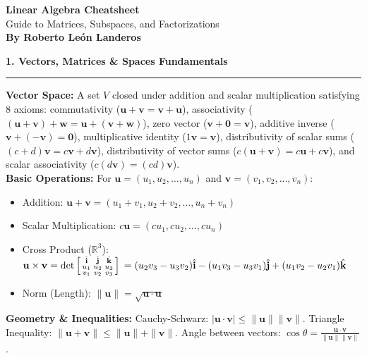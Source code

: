 \documentclass[10pt, landscape, twocolumn]{article}
\newcommand{\cheatsheetsection}[1]{
    \vspace{0.6em}
    {\color{themeblue}\large\bfseries #1} \par
    \vspace{-0.5em}
    {\color{themeblue}\rule{\linewidth}{1pt}} \par
    \vspace{0.2em}
}
\begin{document}
\begin{center}
    \vspace{-1em}
    {\color{themeblue}\huge\bfseries Linear Algebra Cheatsheet}\\[0.1em]
    {\color{themegray}\small Guide to Matrices, Subspaces, and Factorizations}\\[0.4em]
    {\color{themegray}\footnotesize \textbf{By Roberto León Landeros}}
\end{center}
\vspace{-1em}

\cheatsheetsection{1. Vectors, Matrices \& Spaces Fundamentals}
\textbf{Vector Space:} A set $V$ closed under addition and scalar multiplication satisfying 8 axioms: commutativity ($\mathbf{u}+\mathbf{v}=\mathbf{v}+\mathbf{u}$), associativity ($(\mathbf{u}+\mathbf{v})+\mathbf{w}=\mathbf{u}+(\mathbf{v}+\mathbf{w})$), zero vector ($\mathbf{v}+\mathbf{0}=\mathbf{v}$), additive inverse ($\mathbf{v}+(-\mathbf{v})=\mathbf{0}$), multiplicative identity ($1\mathbf{v}=\mathbf{v}$), distributivity of scalar sums ($(c+d)\mathbf{v}=c\mathbf{v}+d\mathbf{v}$), distributivity of vector sums ($c(\mathbf{u}+\mathbf{v})=c\mathbf{u}+c\mathbf{v}$), and scalar associativity ($c(d\mathbf{v})=(cd)\mathbf{v}$).\\
\textbf{Basic Operations:} For $\mathbf{u} = (u_1, u_2, \dots, u_n)$ and $\mathbf{v} = (v_1, v_2, \dots, v_n)$:
\begin{itemize}[leftmargin=*, itemsep=4pt, parsep=0pt]
    \item Addition: $\mathbf{u} + \mathbf{v} = (u_1+v_1, u_2+v_2, \dots, u_n+v_n)$
    \item Scalar Multiplication: $c\mathbf{u} = (cu_1, cu_2, \dots, cu_n)$
    \item Cross Product ($\mathbb{R}^3$): $\mathbf{u} \times \mathbf{v} = \det \left[ \begin{smallmatrix} \hat{\mathbf{i}} & \hat{\mathbf{j}} & \hat{\mathbf{k}} \\ u_1 & u_2 & u_3 \\ v_1 & v_2 & v_3 \end{smallmatrix} \right] \\= (u_2v_3 - u_3v_2)\hat{\mathbf{i}} - (u_1v_3 - u_3v_1)\hat{\mathbf{j}} + (u_1v_2 - u_2v_1)\hat{\mathbf{k}}$
    \item Norm (Length): $\|\mathbf{u}\| = \sqrt{\mathbf{u} \cdot \mathbf{u}}$
\end{itemize}
\textbf{Geometry \& Inequalities:} Cauchy-Schwarz: $|\mathbf{u} \cdot \mathbf{v}| \leq \|\mathbf{u}\|\|\mathbf{v}\|$. Triangle Inequality: $\|\mathbf{u} + \mathbf{v}\| \leq \|\mathbf{u}\| + \|\mathbf{v}\|$. Angle between vectors: $\cos\theta = \frac{\mathbf{u} \cdot \mathbf{v}}{\|\mathbf{u}\|\|\mathbf{v}\|}$.\\
\end{document}
